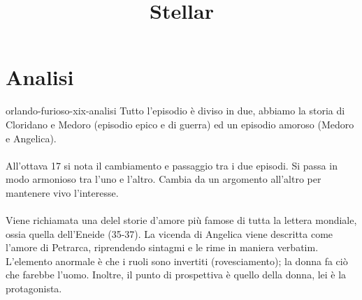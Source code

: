 \documentclass[preview]{standalone}
\begin{document}
\title{Stellar}
\genpage

\section{Analisi}

\begin{snippet}{orlando-furioso-xix-analisi}
    Tutto l'episodio è diviso in due,
    abbiamo la storia di Cloridano e Medoro (episodio epico e di guerra)
    ed un episodio amoroso (Medoro e Angelica).
    \\\\
    All'ottava 17 si nota il cambiamento e passaggio tra i due episodi.
    Si passa in modo armonioso tra l'uno e l'altro.
    Cambia da un argomento all'altro per mantenere vivo l'interesse.
    \\\\
    Viene richiamata una delel storie d'amore più famose di tutta la lettera mondiale,
    ossia quella dell'Eneide (35-37).
    La vicenda di Angelica viene descritta come l'amore di Petrarca, riprendendo sintagmi
    e le rime in maniera verbatim.
    L'elemento anormale è che i ruoli sono invertiti (rovesciamento); la donna
    fa ciò che farebbe l'uomo. Inoltre, il punto di prospettiva è quello della donna,
    lei è la protagonista.
\end{snippet}
\end{document}
